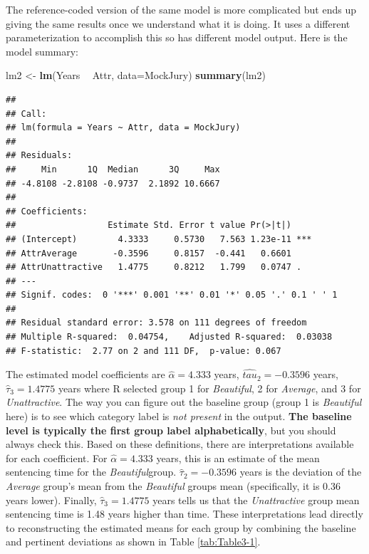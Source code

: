 \documentclass[]{book}
\newenvironment{Shaded}{\begin{snugshade}}{\end{snugshade}}
\newcommand{\KeywordTok}[1]{\textcolor[rgb]{0.13,0.29,0.53}{\textbf{#1}}}
\newcommand{\DataTypeTok}[1]{\textcolor[rgb]{0.13,0.29,0.53}{#1}}
\newcommand{\StringTok}[1]{\textcolor[rgb]{0.31,0.60,0.02}{#1}}
\newcommand{\OperatorTok}[1]{\textcolor[rgb]{0.81,0.36,0.00}{\textbf{#1}}}
\newcommand{\NormalTok}[1]{#1}
\begin{document}
The reference-coded version of the same model is more complicated but
ends up giving the same results once we understand what it is doing. It
uses a different parameterization to accomplish this so has different
model output. Here is the model summary:

\begin{Shaded}
\begin{Highlighting}[]
\NormalTok{lm2 <-}\StringTok{ }\KeywordTok{lm}\NormalTok{(Years }\OperatorTok{~}\StringTok{ }\NormalTok{Attr, }\DataTypeTok{data=}\NormalTok{MockJury)}
\KeywordTok{summary}\NormalTok{(lm2)}
\end{Highlighting}
\end{Shaded}

\begin{verbatim}
## 
## Call:
## lm(formula = Years ~ Attr, data = MockJury)
## 
## Residuals:
##     Min      1Q  Median      3Q     Max 
## -4.8108 -2.8108 -0.9737  2.1892 10.6667 
## 
## Coefficients:
##                  Estimate Std. Error t value Pr(>|t|)    
## (Intercept)        4.3333     0.5730   7.563 1.23e-11 ***
## AttrAverage       -0.3596     0.8157  -0.441   0.6601    
## AttrUnattractive   1.4775     0.8212   1.799   0.0747 .  
## ---
## Signif. codes:  0 '***' 0.001 '**' 0.01 '*' 0.05 '.' 0.1 ' ' 1
## 
## Residual standard error: 3.578 on 111 degrees of freedom
## Multiple R-squared:  0.04754,    Adjusted R-squared:  0.03038 
## F-statistic:  2.77 on 2 and 111 DF,  p-value: 0.067
\end{verbatim}

The estimated model coefficients are \(\hat{\alpha} = 4.333\) years,
\(\hat{tau}_2 =-0.3596\) years, \(\hat{\tau}_3=1.4775\) years where R
selected group 1 for \emph{Beautiful}, 2 for \emph{Average}, and 3 for
\emph{Unattractive}. The way you can figure out the baseline group
(group 1 is \emph{Beautiful} here) is to see which category label is
\emph{not present} in the output. \textbf{The baseline level is
typically the first group label alphabetically}, but you should always
check this. Based on these definitions, there are interpretations
available for each coefficient. For \(\hat{\alpha} = 4.333\) years, this
is an estimate of the mean sentencing time for the
\emph{Beautiful}group. \(\hat{\tau}_2 =-0.3596\) years is the deviation
of the \emph{Average} group's mean from the \emph{Beautiful} groups mean
(specifically, it is \(0.36\) years lower). Finally,
\(\hat{\tau}_3=1.4775\) years tells us that the \emph{Unattractive}
group mean sentencing time is 1.48 years higher than time. These
interpretations lead directly to reconstructing the estimated means for
each group by combining the baseline and pertinent deviations as shown
in Table \ref{tab:Table3-1}.
\end{document}
